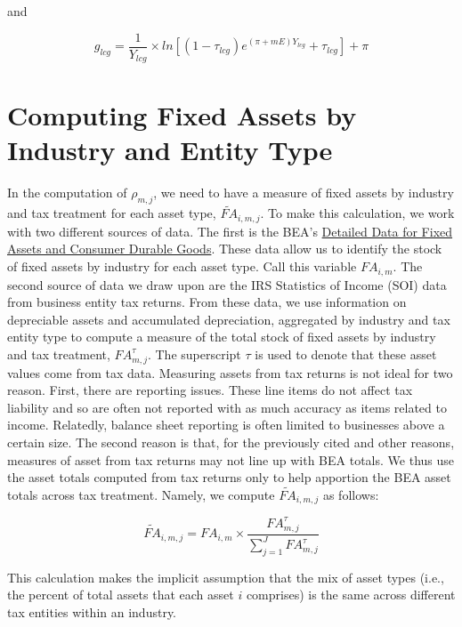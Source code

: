 \documentclass[article,11pt,letterpaper,fleqn]{article}
\theoremstyle{definition}
\numberwithin{equation}{section}
\begin{document}
\noindent\noindent and

\begin{equation}
g_{lcg} = \frac{1}{Y_{lcg}}\times ln\left[(1-\tau_{lcg})e^{(\pi+mE)Y_{lcg}}+\tau_{lcg}\right]+\pi
\end{equation}


\section{Computing Fixed Assets by Industry and Entity Type}

In the computation of $\rho_{m,j}$, we need to have a measure of fixed assets by industry and tax treatment for each asset type, $\widetilde{FA}_{i,m,j}$.  To make this calculation, we work with two different sources of data.  The first is the BEA's \href{http://www.bea.gov/national/FA2004/Details/Index.html}{Detailed Data for Fixed Assets and Consumer Durable Goods}.  These data allow us to identify the stock of fixed assets by industry for each asset type.  Call this variable $FA_{i,m}$.  The second source of data we draw upon are the IRS Statistics of Income (SOI) data from business entity tax returns.  From these data, we use information on depreciable assets and accumulated depreciation, aggregated by industry and tax entity type to compute a measure of the total stock of fixed assets by industry and tax treatment, $FA^{\tau}_{m,j}$.  The superscript $\tau$ is used to denote that these asset values come from tax data.  Measuring assets from tax returns is not ideal for two reason.  First, there are reporting issues.  These line items do not affect tax liability and so are often not reported with as much accuracy as items related to income.  Relatedly, balance sheet reporting is often limited to businesses above a certain size.  The second reason is that, for the previously cited and other reasons, measures of asset from tax returns may not line up with BEA totals.  We thus use the asset totals computed from tax returns only to help apportion the BEA asset totals across tax treatment.  Namely, we compute $\widetilde{FA}_{i,m,j}$ as follows:

\begin{equation}
\label{eqn:asset_bridge}
\widetilde{FA}_{i,m,j} = FA_{i,m}\times \frac{FA^{\tau}_{m,j}}{\sum_{j=1}^{J} FA^{\tau}_{m,j}}
\end{equation}

\noindent\noindent This calculation makes the implicit assumption that the mix of asset types (i.e., the percent of total assets that each asset $i$ comprises) is the same across different tax entities within an industry.  
\end{document}
